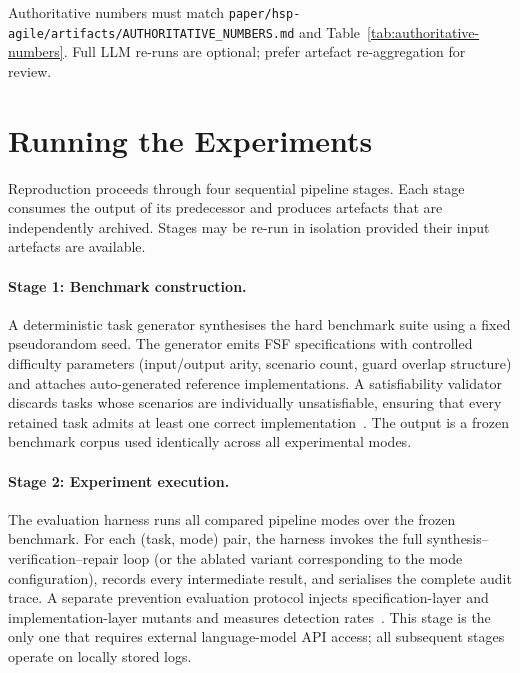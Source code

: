 Authoritative numbers must match
\texttt{paper/hsp-agile/artifacts/AUTHORITATIVE\_NUMBERS.md} and
Table~\ref{tab:authoritative-numbers}.
Full LLM re-runs are optional; prefer artefact re-aggregation for review.

\section{Running the Experiments}
\label{sec:repro:running}

Reproduction proceeds through four sequential pipeline stages.  Each stage consumes
the output of its predecessor and produces artefacts that are independently
archived.  Stages may be re-run in isolation provided their input artefacts
are available.

\paragraph{Stage 1: Benchmark construction.}
A deterministic task generator synthesises the hard benchmark suite
using a fixed pseudorandom seed.  The generator emits FSF
specifications with controlled difficulty parameters (input/output
arity, scenario count, guard overlap structure) and attaches
auto-generated reference implementations.  A satisfiability validator
discards tasks whose scenarios are individually unsatisfiable,
ensuring that every retained task admits at least one correct
implementation~\citep{demoura2008z3,barrett2018smt}.  The output is a frozen benchmark corpus used
identically across all experimental modes.

\paragraph{Stage 2: Experiment execution.}
The evaluation harness runs all compared pipeline modes over the
frozen benchmark.  For each (task, mode) pair, the harness invokes
the full synthesis--verification--repair loop (or the ablated variant
corresponding to the mode configuration), records every intermediate
result, and serialises the complete audit trace.  A separate prevention
evaluation protocol injects specification-layer and
implementation-layer mutants and measures detection rates~\citep{demillo1978mutation,li2023iet_faultprevention}.  This stage
is the only one that requires external language-model API access;
all subsequent stages operate on locally stored logs.

